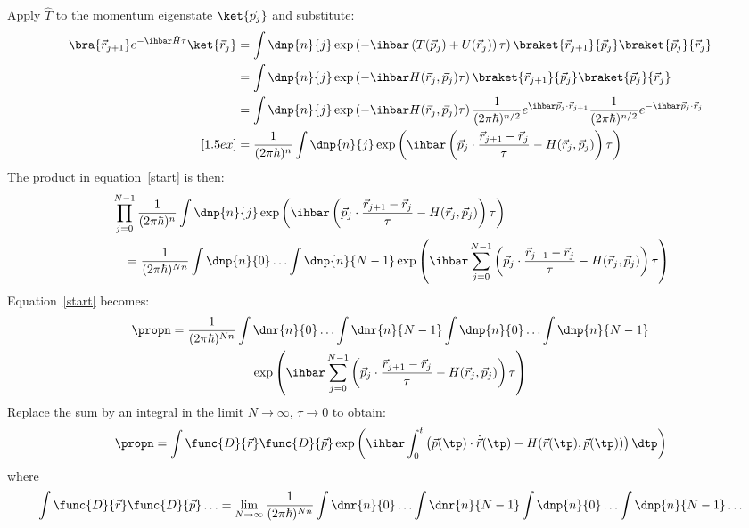 Apply $\hat{T}$ to the momentum eigenstate $\ket{\vec{p}_j}$ and substitute:
\begin{align*}
  \bra{\vec{r}_{j + 1}}
  e^{-\ihbar\hat{H}\tau}
  \ket{\vec{r}_j}
   & =
  \int\dnp{n}{j}
  \exp\left(-\ihbar\left(T(\vec{p}_j) + U(\vec{r}_j)\right)\tau\right)
  \braket{\vec{r}_{j + 1}}{\vec{p}_j}
  \braket{\vec{p}_j}{\vec{r}_j}
  \\
   & =
  \int\dnp{n}{j}
  \exp\left(-\ihbar H(\vec{r}_j, \vec{p}_j)\tau\right)
  \braket{\vec{r}_{j + 1}}{\vec{p}_j}
  \braket{\vec{p}_j}{\vec{r}_j}
  \\
   & =
  \int\dnp{n}{j}
  \exp\left(-\ihbar H(\vec{r}_j, \vec{p}_j)\tau\right)
  \frac{1}{(2\pi\hbar)^{n/2}} e^{\ihbar\vec{p}_j \cdot \vec{r}_{j + 1}}
  \frac{1}{(2\pi\hbar)^{n/2}} e^{-\ihbar\vec{p}_j \cdot \vec{r}_{j}}
  \\
  [1.5ex]
   & =
  \frac{1}{(2\pi\hbar)^{n}}
  \int\dnp{n}{j}
  \exp\left(\ihbar\left(
  \vec{p}_j\cdot\frac{\vec{r}_{j + 1}-\vec{r}_j}{\tau} - H(\vec{r}_j, \vec{p}_j)
  \right)\tau\right)
\end{align*}
The product in equation~\ref{start} is then:
\begin{align*}
   & \prod_{j = 0}^{N - 1}
  \frac{1}{(2\pi\hbar)^{n}}
  \int\dnp{n}{j}
  \exp\left(\ihbar\left(
  \vec{p}_j \cdot \frac{\vec{r}_{j + 1}-\vec{r}_j}{\tau} - H(\vec{r}_j, \vec{p}_j)
  \right)\tau\right)
  \\
   & \quad =
  \frac{1}{(2\pi\hbar)^{N n}}
  \int\dnp{n}{0}\ldots\int\dnp{n}{N - 1}
  \exp\left(\ihbar\sum_{j = 0}^{N - 1}\left(
  \vec{p}_j \cdot \frac{\vec{r}_{j + 1}-\vec{r}_j}{\tau} - H(\vec{r}_j, \vec{p}_j)
  \right)\tau\right)
\end{align*}
Equation~\ref{start} becomes:
\begin{multline*}
  \propn =
  \frac{1}{(2\pi\hbar)^{N n}}
  \int\dnr{n}{0}\ldots\int\dnr{n}{N - 1}\int\dnp{n}{0}\ldots\int\dnp{n}{N - 1}
  \\
  \exp\left(\ihbar\sum_{j = 0}^{N - 1}\left(
  \vec{p}_j \cdot \frac{\vec{r}_{j + 1}-\vec{r}_j}{\tau} - H(\vec{r}_j, \vec{p}_j)
  \right)\tau\right)
\end{multline*}
Replace the sum by an integral in the limit $N \to \infty$, $\tau \to 0$ to obtain:
\begin{equation*}
  \propn = \int\func{D}{\vec{r}}\func{D}{\vec{p}}\exp\left(
  \ihbar\int_{0}^{t}\left(
  \vec{p}(\tp) \cdot \dot{\vec{r}}(\tp) - H(\vec{r}(\tp), \vec{p}(\tp))
  \right)\dtp
  \right)
\end{equation*}
where
\begin{equation*}
  \int\func{D}{\vec{r}}\func{D}{\vec{p}}\ldots
  = \lim_{N \to \infty}
  \frac{1}{(2\pi\hbar)^{N n}}
  \int\dnr{n}{0}\ldots\int\dnr{n}{N - 1}
  \int\dnp{n}{0}\ldots\int\dnp{n}{N - 1}
  \ldots
\end{equation*}
